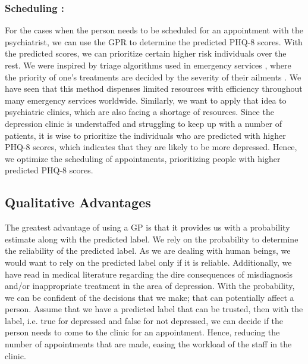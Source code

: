 \documentclass{article}
\begin{document}
	\subsubsection{Scheduling :}
	For the cases when the person needs to be scheduled for an appointment with the psychiatrist, we can use the GPR to determine the predicted PHQ-8 scores. 
    With the predicted scores, we can prioritize certain higher risk individuals over the rest. 
    We were inspired by triage algorithms used in emergency services \cite{shah2015managing,oredsson2011systematic}, where the priority of one's treatments are decided by the severity of their ailments \cite{wiki:Triage}.
    We have seen that this method dispenses limited resources with efficiency \cite{rosedale2011effectiveness} throughout many emergency services worldwide. 
    Similarly, we want to apply that idea to psychiatric clinics, which are also facing a shortage of resources. 
    Since the depression clinic is understaffed and struggling to keep up with a number of patients, it is wise to prioritize the individuals who are predicted with higher PHQ-8 scores, which indicates that they are likely to be more depressed. 
    Hence, we optimize the scheduling of appointments, prioritizing people with higher predicted PHQ-8 scores.

	\subsection{Qualitative Advantages}
The greatest advantage of using a GP is that it provides us with a probability estimate along with the predicted label. 
    We rely on the probability to determine the reliability of the predicted label. 
    As we are dealing with human beings, we would want to rely on the predicted label only if it is reliable. 
    Additionally, we have read in medical literature regarding the dire consequences of misdiagnosis and/or inappropriate treatment \cite{nasrallah2015consequences,bowden2001strategies,dunner2003clinical} in the area of depression. 
    With the probability, we can be confident of the decisions that we make; that can potentially affect a person. 
    Assume that we have a predicted label that can be trusted, then with the label, i.e. true for depressed and false for not depressed, we can decide if the person needs to come to the clinic for an appointment. 
    Hence, reducing the number of appointments that are made, easing the workload of the staff in the clinic. \\
    
\end{document}
